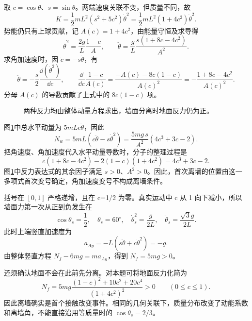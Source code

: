 \begin{solution}
取 $c=\cos\theta$、$s=\sin\theta$。两端速度关联不变，但质量不同，故
\[
K=\frac12mL^2(s^2+5c^2)\dot\theta^2
=\frac12mL^2(1+4c^2)\dot\theta^2.
\]
势能仍只有上球贡献，记 $A(c)=1+4c^2$，由能量守恒及求导得
\[
\dot\theta^2=\frac{2g}{L}\frac{1-c}{A},\qquad
\ddot\theta=\frac gL\frac{s(1+8c-4c^2)}{A^2}.
\]
求角加速度时，因 $\dot c=-s\dot\theta$，有
\[
\ddot\theta=-\frac s2\frac{\dd(\dot\theta^2)}{\dd c},\qquad
\frac{\dd}{\dd c}\frac{1-c}{A(c)}
=\frac{-A(c)-8c(1-c)}{A(c)^2}
=-\frac{1+8c-4c^2}{A(c)^2}.
\]
分母 $A(c)$ 的导数贡献了上式中的 $8c(1-c)$ 项。

\begin{figure}[H]\centering
{}
\caption{两种反力均由整体动量方程求出，墙面分离时地面反力仍为正。}\label{sup2:fig:d2-h5-s}
\end{figure}

图\ref{sup2:fig:d2-h5-s}中总水平动量为 $5mL c\dot\theta$，因此
\[
N_w=5mL(c\ddot\theta-s\dot\theta^2)
=\frac{5mg\,s}{A^2}(4c^3+3c-2).
\]
把角速度、角加速度代入水平动量导数时，分子的整理过程是
\[
c(1+8c-4c^2)-2(1-c)(1+4c^2)=4c^3+3c-2.
\]
图\ref{sup2:fig:d2-h5-s}中反力表达式的其余因子满足 $s>0$、$A^2>0$。因此，首次离墙的位置由这一多项式首次变号确定，角加速度变号不构成离墙条件。

括号在 $[0,1]$ 严格递增，且在 c=1/2 为零。真实运动中 c 从 1 向下减小，所以墙面力第一次从正到负发生在
\[
\cos\theta_s=\frac12,\quad \theta_s=60^\circ,
\quad \dot\theta_s^2=\frac g{2L},\quad
\ddot\theta_s=\frac{\sqrt3g}{2L}.
\]
此时上端竖直加速度为
\[
a_{Ay}=-L(s\ddot\theta+c\dot\theta^2)=-g.
\]
由整体竖直方程 $N_f-6mg=m a_{Ay}$，得到 $N_f=5mg>0$。

还须确认地面不会在此前先分离。对本题可将地面反力化简为
\[
N_f=5mg\frac{(1-c)^2+10c^2+20c^4}{(1+4c^2)^2}>0
\qquad(0\le c\le1).
\]
因此离墙确实是首个接触改变事件。相同的几何关联下，质量分布改变了动能系数和离墙角，不能直接沿用等质量时的 $\cos\theta_s=2/3$。

\end{solution}


